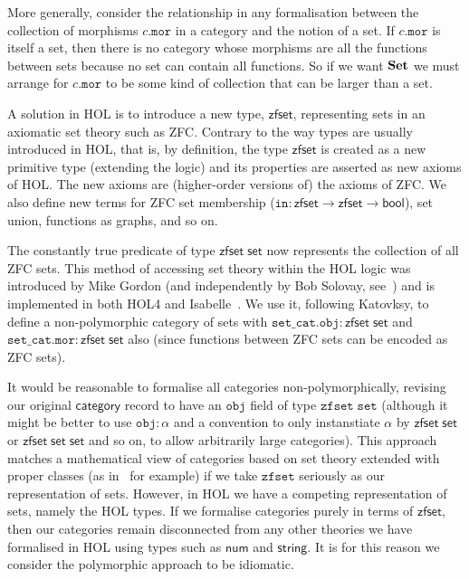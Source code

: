 \documentclass[twoside,titlepage,11pt]{article}
\begin{document}
More generally, consider the relationship in any formalisation between the collection of morphisms $c.\mathtt{mor}$ in a category and the notion of a set.
If $c.\mathtt{mor}$ is itself a set, then there is no category whose morphisms are all the functions between sets because no set can contain all functions.
So if we want $\mathbf{Set}$ we must arrange for $c.\mathtt{mor}$ to be some kind of collection that can be larger than a set.

A solution in HOL is to introduce a new type, $\mathsf{zfset}$, representing sets in an axiomatic set theory such as ZFC.
Contrary to the way types are usually introduced in HOL, that is, by definition, the type $\mathsf{zfset}$ is created as a new primitive type (extending the logic) and its properties are asserted as new axioms of HOL.
The new axioms are (higher-order versions of) the axioms of ZFC.
We also define new terms for ZFC set membership ($\mathtt{in}:\mathsf{zfset}\to\mathsf{zfset}\to\mathsf{bool}$), set union, functions as graphs, and so on.

The constantly true predicate of type $\mathsf{zfset}\;\mathsf{set}$ now represents the collection of all ZFC sets.
This method of accessing set theory within the HOL logic was introduced by Mike Gordon \cite{DBLP:conf/tphol/Gordon96} (and independently by Bob Solovay, see~\cite{DBLP:conf/ictac/Obua06}) and is implemented in both HOL4 and Isabelle~\cite{DBLP:conf/ictac/Obua06}.
We use it, following Katovksy, to define a non-polymorphic category of sets with $\mathtt{set\_cat}.\mathtt{obj}:\mathsf{zfset}\;\mathsf{set}$ and $\mathtt{set\_cat}.\mathtt{mor}:\mathsf{zfset}\;\mathsf{set}$ also (since functions between ZFC sets can be encoded as ZFC sets).

It would be reasonable to formalise all categories non-polymorphically, revising our original $\mathsf{category}$ record to have an $\mathtt{obj}$ field of type $\mathtt{zfset}\;\mathtt{set}$ (although it might be better to use $\mathtt{obj}:\alpha$ and a convention to only instanstiate $\alpha$ by $\mathsf{zfset}\;\mathsf{set}$ or $\mathsf{zfset}\;\mathsf{set}\;\mathsf{set}$ and so on, to allow arbitrarily large categories).
This approach matches a mathematical view of categories based on set theory extended with proper classes (as in~\cite{MacLaneCFTWM} for example) if we take $\mathtt{zfset}$ seriously as our representation of sets.
However, in HOL we have a competing representation of sets, namely the HOL types.
If we formalise categories purely in terms of $\mathsf{zfset}$, then our categories remain disconnected from any other theories we have formalised in HOL using types such as $\mathsf{num}$ and $\mathsf{string}$.
It is for this reason we consider the polymorphic approach to be idiomatic.
\end{document}
